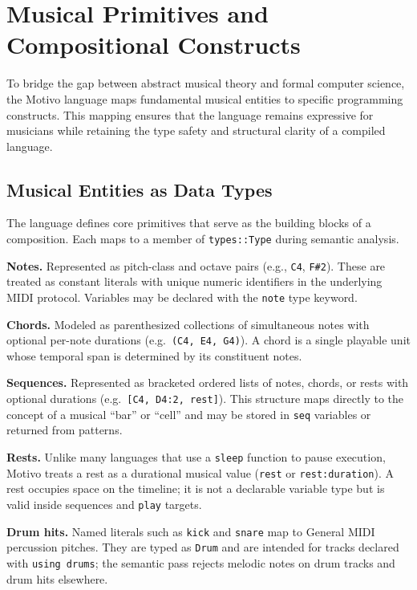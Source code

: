 \section{Musical Primitives and Compositional Constructs}\label{sec:musical-primitives}

To bridge the gap between abstract musical theory and formal computer science, the Motivo language maps
fundamental musical
entities to specific programming constructs.
This mapping ensures that the language remains expressive for musicians while retaining the type safety and structural
clarity of a compiled language.

\subsection{Musical Entities as Data Types}\label{detail-subsec:musical-entities-as-data-types}

The language defines core primitives that serve as the building blocks of a composition.
Each maps to a member of \texttt{types::Type} during semantic analysis.

\noindent \textbf{Notes.} Represented as pitch-class and octave pairs (e.g., \texttt{C4}, \texttt{F\#2}).
These are treated as constant literals with unique numeric identifiers in the underlying MIDI protocol.
Variables may be declared with the \texttt{note} type keyword.

\noindent \textbf{Chords.} Modeled as parenthesized collections of simultaneous notes with optional per-note
durations (e.g.\ \texttt{(C4, E4, G4)}).
A chord is a single playable unit whose temporal span is determined by its constituent notes.

\noindent \textbf{Sequences.} Represented as bracketed ordered lists of notes, chords, or rests with optional
durations (e.g.\ \texttt{[C4, D4:2, rest]}).
This structure maps directly to the concept of a musical ``bar'' or ``cell'' and may be stored in \texttt{seq}
variables or returned from patterns.

\noindent \textbf{Rests.} Unlike many languages that use a \texttt{sleep} function to pause execution, Motivo treats a
rest as a durational musical value (\texttt{rest} or \texttt{rest:duration}).
A rest occupies space on the timeline; it is not a declarable variable type but is valid inside sequences and
\texttt{play} targets.

\noindent \textbf{Drum hits.} Named literals such as \texttt{kick} and \texttt{snare} map to General MIDI percussion
pitches.
They are typed as \texttt{Drum} and are intended for tracks declared with \texttt{using drums}; the semantic pass
rejects melodic notes on drum tracks and drum hits elsewhere.

